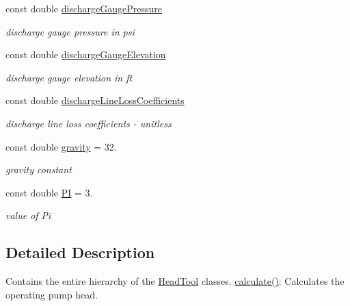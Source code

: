 \begin{DoxyCompactItemize}
\mbox{\label{class_head_tool_base_a39c854f13b16967e02a67cd1aaee07c4}} 
const double \hyperlink{class_head_tool_base_a39c854f13b16967e02a67cd1aaee07c4}{discharge\+Gauge\+Pressure}
\begin{DoxyCompactList}\small\item\em discharge gauge pressure in psi \end{DoxyCompactList}\item 
\mbox{\label{class_head_tool_base_a9ed2160992f8da2e335d919cf9aedd08}} 
const double \hyperlink{class_head_tool_base_a9ed2160992f8da2e335d919cf9aedd08}{discharge\+Gauge\+Elevation}
\begin{DoxyCompactList}\small\item\em discharge gauge elevation in ft \end{DoxyCompactList}\item 
\mbox{\label{class_head_tool_base_a147c035c7422406c594c5fd42ab11eb0}} 
const double \hyperlink{class_head_tool_base_a147c035c7422406c594c5fd42ab11eb0}{discharge\+Line\+Loss\+Coefficients}
\begin{DoxyCompactList}\small\item\em discharge line loss coefficients -\/ unitless \end{DoxyCompactList}\item 
\mbox{\label{class_head_tool_base_a687da90a9c2f44cb51061d9fad30c002}} 
const double \hyperlink{class_head_tool_base_a687da90a9c2f44cb51061d9fad30c002}{gravity} = 32.
\begin{DoxyCompactList}\small\item\em gravity constant \end{DoxyCompactList}\item 
\mbox{\label{class_head_tool_base_a1ed53b699c7d247b2ee13bd4e8493c9c}} 
const double \hyperlink{class_head_tool_base_a1ed53b699c7d247b2ee13bd4e8493c9c}{PI} = 3.
\begin{DoxyCompactList}\small\item\em value of Pi \end{DoxyCompactList}\end{DoxyCompactItemize}


\subsection{Detailed Description}
Contains the entire hierarchy of the \hyperlink{class_head_tool}{Head\+Tool} classes. \hyperlink{class_head_tool_base_a82024c0ce01699aa24509c964267c392}{calculate()}\+: Calculates the operating pump head. 

